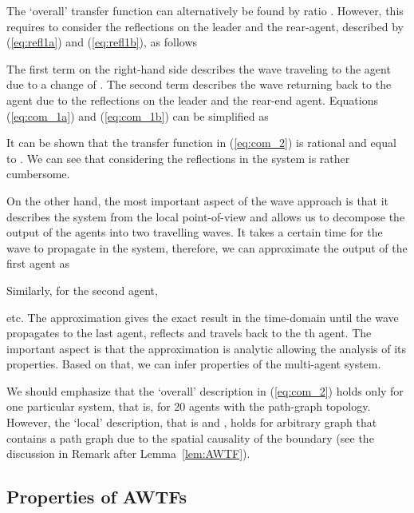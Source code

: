 \documentclass[10pt,twocolumn,twoside]{IEEEtran}
\theoremstyle{definition}
\begin{document}
The `overall' transfer function  can alternatively be found by ratio . However, this requires to consider the reflections on the leader and the rear-agent, described by (\ref{eq:refl1a}) and (\ref{eq:refl1b}), as follows

The first term on the right-hand side describes the wave traveling to the agent due to a change of . The second term describes the wave returning back to the agent due to the reflections on the leader and the rear-end agent. Equations (\ref{eq:com_1a}) and (\ref{eq:com_1b}) can be simplified as

It can be shown that the transfer function in (\ref{eq:com_2}) is rational and equal to . We can see that considering the reflections in the system is rather cumbersome.

On the other hand, the most important aspect of the wave approach is that it describes the system from the local point-of-view and allows us to decompose the output of the agents into two travelling waves. It takes a certain time for the wave to propagate in the system, therefore, we can approximate the output of the first agent as

Similarly, for the second agent,

etc. The approximation gives the exact result in the time-domain until the wave propagates to the last agent, reflects and travels back to the th agent. The important aspect is that the approximation is analytic allowing the analysis of its properties. Based on that, we can infer properties of the multi-agent system.

We should emphasize that the `overall' description in (\ref{eq:com_2}) holds only for one particular system, that is, for 20 agents with the path-graph topology. However, the `local' description, that is  and , holds for arbitrary graph that contains a path graph due to the spatial causality of the boundary (see the discussion in Remark after Lemma~\ref{lem:AWTF}).








\subsection{Properties of AWTFs}
\end{document}
